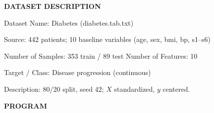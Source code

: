 \documentclass[11pt,twoside]{article}
\newcommand{\expheading}[1]{{\fontsize{14}{17}\selectfont\textbf{#1}\par}}
\begin{document}
{\expheading{DATASET DESCRIPTION}
\vspace{4pt}
\noindent Dataset Name: Diabetes (diabetes.tab.txt)\par
\noindent Source: 442 patients; 10 baseline variables (age, sex, bmi, bp, s1--s6)\par
\noindent Number of Samples: 353 train / 89 test \hspace{0.3cm} Number of Features: 10\par
\noindent Target / Class: Disease progression (continuous)\par
\noindent Description: 80/20 split, seed 42; $X$ standardized, $y$ centered. \par
\vspace{4pt}
} %

\newpage
\expheading{PROGRAM}
\vspace{6pt}
\end{document}

